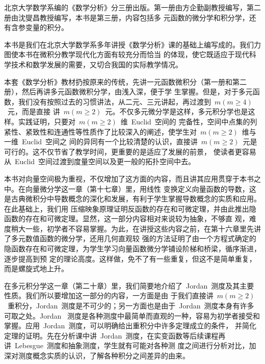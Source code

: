 
\begin{preface}
北京大学数学系编的《数学分析》分三册出版。第一册由方企勤副教授编写，第二册由沈燮昌教授编写，本书是第三册，内容包括多
元函数的微分学和积分学，还有含参变量的积分。

本书是我们在北京大学数学系多年讲授《数学分析》课的基础上编写成的。我们力图使本书在微积分教学现代化方面有较充分而恰当
的体现，使它既适应于现代科学技术和数学发展的需要，又切合我国的实际教学情况。

本套《数学分析》教材扔按原来的传统，先讲一元函数微积分（第一册和第二册），然后再讲多元函数微积分学，由浅入深，便于学
生掌握。但是，对于多元函数，我们没有按照过去的习惯讲法，从二元、三元讲起，再过渡到~$m(m\geqslant4)$~元，而是直接
讲~$m(m\geqslant2)$~元。不仅多元微分学是这样，多元积分学也是这样。实践证明，只要对~$m(m\geqslant2)$~维~Euclid~空间的
完备性，空间中点集的列紧性、紧致性和连通性等性质作了比较深入的阐述，使学生对~$m(m\geqslant2)$~维与一维~Euclid~空间之
间的异同有一个比较清楚的认识，直接讲~$m(m\geqslant2)$~元是可行的。这不仅节省了教学时间，更重要的是适应了发展的前景，%
使读者更容易从~Euclid~空间过渡到度量空间以及更一般的拓扑空间中去。

本书对向量空间极为重视，不仅增加了这方面的内容，而且讲其应用贯穿于本书之中。在向量微分学这一章（第十七章）里，用线性
变换定义向量函数的导数，这是古典微积分中导数概念的深化和发展，有利于学生掌握导数概念的实质和应用。在此基础上，我们用
压缩映象原理证明反函数的存在和可微定理，并由此推出隐函数的存在和可微定理。显然，这一部分内容相对来说较为抽象，不够直
观，难度稍大一些，初学者不容易掌握。为此，在讲授这些内容之前，在第十六章里先讲了多元数值函数的微分学，还用几何直观较
强的方法证明了由一个方程式确定的隐函数存在和可微定理，为学生学习向量函数微分学铺设阶梯和桥梁，循序渐进，逐步提高到预
定的理论高度。这样做，免不了有一些重复，但这不是简单重复，而是螺旋式地上升。

在多元积分学这一章（第二十章）里，我们简要地介绍了~Jordan~测度及其主要性质。我们所以要增加这一部分的内容，一方面是由
于我们直接讲~$m(m\geqslant2)$~重积分，Jordan~测度是不可少的；另一方面也是由于~Jordan~测度本身有许多可取之处。Jordan~
测度是各种测度中最简单而直观的一种，容易为初学者接受和掌握。应用~Jordan~测度，可以明确给出重积分中许多定理成立的条件，%
并简化定理的证明。先在分析课中讲~Jordan~测度，在实变函数等后续课程再讲~Lebesgue~测度和抽象测度，学生就有可能对各种测
度之间进行分析对比，加深对测度概念实质的认识，了解各种积分之间差异的由来。


\end{preface}
